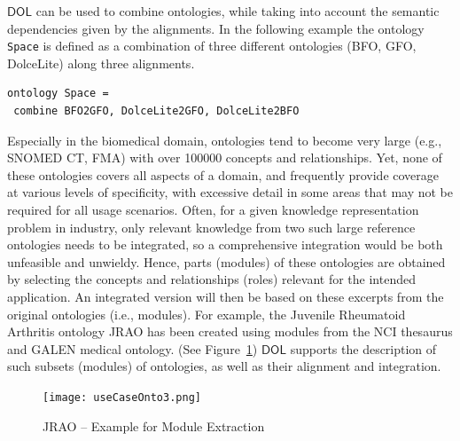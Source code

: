 \documentclass[10pt, a4paper]{isov2}
\newcommand*{\DOL}{\ensuremath{\mathsf{DOL}}\xspace}
\renewcommand{\figurerefname}{Figure}
\renewcommand{\fref}[1]{\figurerefname~\ref{#1}}
\begin{document}
 \DOL can be used to combine ontologies, while taking into account the semantic dependencies given by the alignments. In the following example the ontology \lstinline{Space} is defined as a combination of three different ontologies (BFO, GFO, DolceLite) along three alignments. 

\begin{lstlisting}[basicstyle=\ttfamily\footnotesize,language=dolText,escapechar=@,mathescape]
ontology Space =
 combine BFO2GFO, DolceLite2GFO, DolceLite2BFO
\end{lstlisting} 




\label{onto-3}
Especially in the biomedical domain, ontologies tend to become very large (e.g., SNOMED CT, FMA) 
with over 100000 concepts and relationships. Yet, none of these ontologies covers all aspects of a 
domain, and frequently provide coverage at various levels of specificity, with excessive detail in 
some areas that may not be required for all usage scenarios. Often, for a given knowledge 
representation problem in industry, only relevant knowledge from two such large reference 
ontologies needs to be integrated, so a comprehensive integration would be both unfeasible and 
unwieldy. Hence, parts (modules) of these ontologies are obtained by selecting the concepts and 
relationships (roles) relevant for the intended application. An integrated version will then be 
based on these excerpts from the original ontologies (i.e., modules). For example, the Juvenile 
Rheumatoid Arthritis ontology JRAO has been created using modules from the NCI thesaurus and GALEN 
medical ontology. (See \fref{JRAO}) \DOL  
supports the description of such subsets (modules) of ontologies, as well as their alignment and 
integration.


\begin{figure}[htbp]
\begin{center}
\texttt{[image: useCaseOnto3.png]}
\caption{JRAO  -- Example for Module Extraction}
\label{JRAO}
\end{center}
\end{figure}
\end{document}
